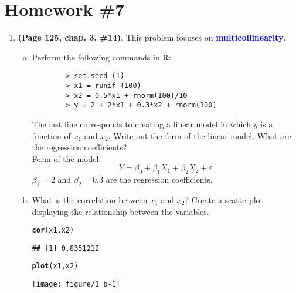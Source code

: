 \documentclass[12pt]{article}\usepackage[]{graphicx}\usepackage[]{color}
\makeatletter
\newcommand{\hlstd}[1]{\textcolor[rgb]{0.345,0.345,0.345}{#1}}%
\newcommand{\hlkwd}[1]{\textcolor[rgb]{0.737,0.353,0.396}{\textbf{#1}}}%
\newenvironment{kframe}{%
 \def\at@end@of@kframe{}%
 \ifinner\ifhmode%
  \def\at@end@of@kframe{\end{minipage}}%
  \begin{minipage}{\columnwidth}%
 \fi\fi%
 \def\FrameCommand##1{\hskip\@totalleftmargin \hskip-\fboxsep
 \colorbox{shadecolor}{##1}\hskip-\fboxsep
     \hskip-\linewidth \hskip-\@totalleftmargin \hskip\columnwidth}%
 \MakeFramed {\advance\hsize-\width
   \@totalleftmargin\z@ \linewidth\hsize
   \@setminipage}}%
 {\par\unskip\endMakeFramed%
 \at@end@of@kframe}
\newenvironment{knitrout}{}{} %
\theoremstyle{definition}
\makeatother
\begin{document}
\rhead{\today}




\section*{Homework \#7}
\begin{enumerate}[1.]
  \item \textbf{(Page 125, chap. 3, \#14)}. This problem focuses on \textbf{\textcolor{blue}{multicollinearity}}.
    \begin{enumerate}[(a)]
      \item Perform the following commands in R:\\[-20pt]
        \begin{verbatim}
        > set.seed (1)
        > x1 = runif (100)
        > x2 = 0.5*x1 + rnorm(100)/10
        > y = 2 + 2*x1 + 0.3*x2 + rnorm(100)
        \end{verbatim}
        \vspace*{-20pt}
        The last line corresponds to creating a linear model in which $y$ is a function of $x_1$ and $x_2$. Write out the form of the linear model. What are the regression coefficients?\\[10pt]
        Form of the model:
        $$Y = \beta_0 + \beta_1X_1 + \beta_2X_2 + \varepsilon$$
        $\beta_1 = 2$ and $\beta_2 = 0.3$ are the regression coefficients.

      \item What is the correlation between $x_1$ and $x_2$? Create a scatterplot displaying the relationship between the variables.
\begin{knitrout}
\color{fgcolor}\begin{kframe}
\begin{alltt}
\hlkwd{cor}\hlstd{(x1,x2)}
\end{alltt}
\begin{verbatim}
## [1] 0.8351212
\end{verbatim}
\begin{alltt}
\hlkwd{plot}\hlstd{(x1,x2)}
\end{alltt}
\end{kframe}
\texttt{[image: figure/1\_b-1]} 


\end{knitrout}
\end{enumerate}
\end{enumerate}
\end{document}
